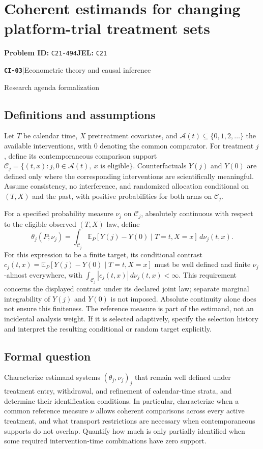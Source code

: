 \documentclass[11pt,a4paper]{article}
\newcommand{\E}{\mathbb E}
\newcommand{\entrymeta}[3]{{\sffamily\small\color{muted}\textbf{\texttt{#1}}\quad|\quad #2\par #3\par}}
\begin{document}
\section*{Coherent estimands for changing platform-trial treatment sets}
\textbf{Problem ID:} \texttt{C21-494}\quad \textbf{JEL:} \texttt{C21}\par
\label{problem:OP-0482}
\label{beyond:CI-03}
\entrymeta{CI-03}{Econometric theory and causal inference}{Research agenda formalization}
\subsection*{Definitions and assumptions}
Let $T$ be calendar time, $X$ pretreatment covariates, and $\mathcal A(t)\subseteq\{0,1,2,\ldots\}$ the available interventions, with $0$ denoting the common comparator. For treatment $j$, define its contemporaneous comparison support
$\mathcal C_j=\{(t,x):j,0\in\mathcal A(t),\ x\text{ is eligible}\}$.
Counterfactuals $Y(j)$ and $Y(0)$ are defined only where the corresponding interventions are scientifically meaningful. Assume consistency, no interference, and randomized allocation conditional on $(T,X)$ and the past, with positive probabilities for both arms on $\mathcal C_j$.

For a specified probability measure $\nu_j$ on $\mathcal C_j$, absolutely continuous with respect to the eligible observed $(T,X)$ law, define
\[
\theta_j(P;\nu_j)=\int_{\mathcal C_j}
 \E_P[Y(j)-Y(0)\mid T=t,X=x]\,d\nu_j(t,x).
\]
For this expression to be a finite target, its conditional contrast $c_j(t,x)=\E_P[Y(j)-Y(0)\mid T=t,X=x]$ must be well defined and finite $\nu_j$-almost everywhere, with $\int_{\mathcal C_j}|c_j(t,x)|\,d\nu_j(t,x)<\infty$. This requirement concerns the displayed contrast under its declared joint law; separate marginal integrability of $Y(j)$ and $Y(0)$ is not imposed. Absolute continuity alone does not ensure this finiteness.
The reference measure is part of the estimand, not an incidental analysis weight. If it is selected adaptively, specify the selection history and interpret the resulting conditional or random target explicitly.
\subsection*{Formal question}
Characterize estimand systems $(\theta_j,\nu_j)_j$ that remain well defined under treatment entry, withdrawal, and refinement of calendar-time strata, and determine their identification conditions. In particular, characterize when a common reference measure $\nu$ allows coherent comparisons across every active treatment, and what transport restrictions are necessary when contemporaneous supports do not overlap. Quantify how much is only partially identified when some required intervention-time combinations have zero support.
\end{document}
